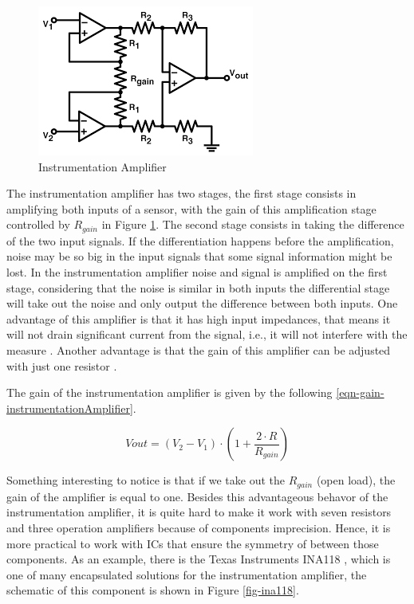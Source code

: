 	\begin{figure}[htbp]
		\centering
			\includegraphics[scale=1.25]{figuras/fig-instrumentation-amp.png}
		\caption{Instrumentation Amplifier \cite{3opamp}}
		\label{fig-instrumentation-amplifier}
	\end{figure}

	The instrumentation amplifier has two stages, the first stage consists in amplifying both inputs of a sensor, with the gain of this amplification stage controlled by $R_{gain}$ in Figure \ref{fig-instrumentation-amplifier}. The second stage consists in taking the difference of the two input signals. If the differentiation happens before the amplification, noise may be so big in the input signals that some signal information might be lost. In the instrumentation amplifier noise and signal is amplified on the first stage, considering that the noise is similar in both inputs the differential stage will take out the noise and only output the difference between both inputs. One advantage of this amplifier is that it has high input impedances, that means it will not drain significant current from the signal, i.e., it will not interfere with the measure \cite{thomsen2003application}. Another advantage is that the gain of this amplifier can be adjusted with just one resistor \cite{mettingvanrijn1994amplifiers}.
	\par
	The gain of the instrumentation amplifier is given by the following \ref{eqn-gain-instrumentationAmplifier}.

	\begin{equation}
		Vout = \left( V_{2} - V_{1} \right) \cdot \left( 1 + \frac{2\cdot R}{R_{gain}} \right)
	\end{equation}\label{eqn-gain-instrumentationAmplifier}

	Something interesting to notice is that if we take out the $R_{gain}$ (open load), the gain of the amplifier is equal to one. Besides this advantageous behavor of the instrumentation amplifier, it is quite hard to make it work with seven resistors and three operation amplifiers because of components imprecision. Hence, it is more practical to work with ICs that ensure the symmetry of between those components. As an example, there is the Texas Instruments INA118 \cite{ina118}, which is one of many encapsulated solutions for the instrumentation amplifier, the schematic of this component is shown in Figure \ref{fig-ina118}.

